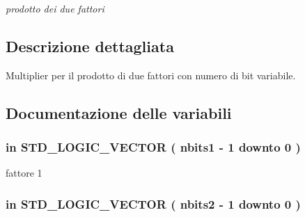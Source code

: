 \begin{DoxyCompactItemize}
\begin{DoxyCompactList}\small\item\em prodotto dei due fattori \end{DoxyCompactList}\end{DoxyCompactItemize}


\subsection{Descrizione dettagliata}
Multiplier per il prodotto di due fattori con numero di bit variabile. 



\subsection{Documentazione delle variabili}
\subsubsection[{\texorpdfstring{factor1}{factor1}}]{ {\bfseries \textcolor{vhdlchar}{in}\textcolor{vhdlchar}{ }} {\bfseries \textcolor{vhdlchar}{S\+T\+D\+\_\+\+L\+O\+G\+I\+C\+\_\+\+V\+E\+C\+T\+OR}\textcolor{vhdlchar}{ }\textcolor{vhdlchar}{(}\textcolor{vhdlchar}{ }\textcolor{vhdlchar}{ }\textcolor{vhdlchar}{ }\textcolor{vhdlchar}{ }{\bfseries {\bf nbits1}} \textcolor{vhdlchar}{-\/}\textcolor{vhdlchar}{ } \textcolor{vhdldigit}{1} \textcolor{vhdlchar}{ }\textcolor{vhdlchar}{downto}\textcolor{vhdlchar}{ }\textcolor{vhdlchar}{ } \textcolor{vhdldigit}{0} \textcolor{vhdlchar}{ }\textcolor{vhdlchar}{)}\textcolor{vhdlchar}{ }} \hspace{0.3cm}{\ttfamily [Port]}}\hypertarget{group___multiplier_gac728adecdbfe10213256c17c1b5c5128}{}\label{group___multiplier_gac728adecdbfe10213256c17c1b5c5128}


fattore 1 

\subsubsection[{\texorpdfstring{factor2}{factor2}}]{ {\bfseries \textcolor{vhdlchar}{in}\textcolor{vhdlchar}{ }} {\bfseries \textcolor{vhdlchar}{S\+T\+D\+\_\+\+L\+O\+G\+I\+C\+\_\+\+V\+E\+C\+T\+OR}\textcolor{vhdlchar}{ }\textcolor{vhdlchar}{(}\textcolor{vhdlchar}{ }\textcolor{vhdlchar}{ }\textcolor{vhdlchar}{ }\textcolor{vhdlchar}{ }{\bfseries {\bf nbits2}} \textcolor{vhdlchar}{-\/}\textcolor{vhdlchar}{ } \textcolor{vhdldigit}{1} \textcolor{vhdlchar}{ }\textcolor{vhdlchar}{downto}\textcolor{vhdlchar}{ }\textcolor{vhdlchar}{ } \textcolor{vhdldigit}{0} \textcolor{vhdlchar}{ }\textcolor{vhdlchar}{)}\textcolor{vhdlchar}{ }} \hspace{0.3cm}{\ttfamily [Port]}}\hypertarget{group___multiplier_gac140852334303b430bbd49689cc689dd}{}\label{group___multiplier_gac140852334303b430bbd49689cc689dd}


